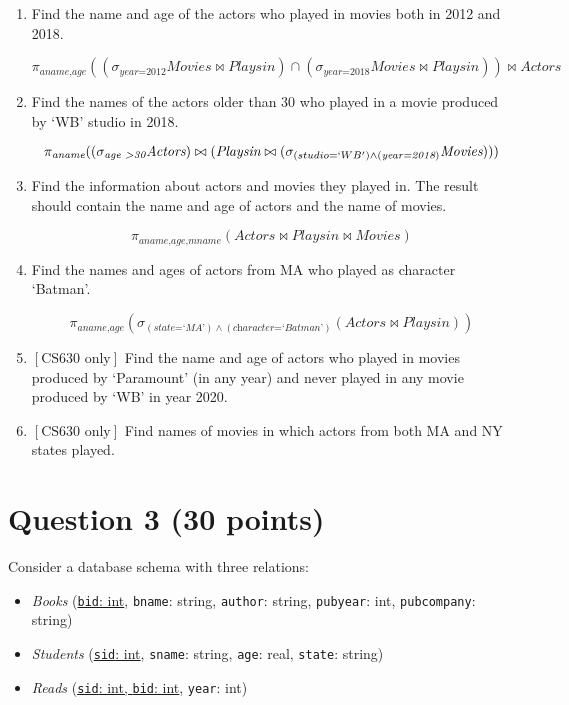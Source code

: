 \documentclass[letterpaper, 11pt]{article}
\begin{document}
\begin{enumerate}[label={\alph*}),leftmargin=*]
\begin{tcolorbox}
    \end{tcolorbox}    
    \item Find the name and age of the actors who played in movies both in 2012 and 2018.
    \begin{tcolorbox}
    \[\pi_{\textit{aname,age}}((\sigma_{\textit{year=2012}}\textit{Movies} \bowtie \textit{Playsin}) \cap (\sigma_{\textit{year=2018}}\textit{Movies} \bowtie \textit{Playsin})) \bowtie \textit{Actors}\]
    \end{tcolorbox}    
    \item Find the names of the actors older than 30 who played in a movie produced by `WB' studio in 2018.
    \begin{tcolorbox}
    \[\pi_{\textit{aname}}((\sigma_{\textit{age \textgreater 30}}\textit{Actors}) \bowtie (\textit{Playsin} \bowtie (\sigma_{(studio=`WB') \wedge (\textit{year=2018})}\textit{Movies})))\]
    \end{tcolorbox}    
    \item Find the information about actors and movies they played in. The result should contain the name and age of actors and the name of movies.
    \begin{tcolorbox}
    \[\pi_{\textit{aname,age,mname}}(\textit{Actors} \bowtie \textit{Playsin} \bowtie \textit{Movies})\]
    \end{tcolorbox}    
    \item Find the names and ages of actors from MA who played as character `Batman'.
    \begin{tcolorbox}
    \[\pi_{\textit{aname,age}}(\sigma_{(\textit{state=`MA'})\wedge (\textit{character=`Batman'})}(\textit{Actors} \bowtie \textit{Playsin}))\]
    \end{tcolorbox}    
    \item $\left[\text{CS630 only}\right]$ Find the name and age of actors who played in movies produced by `Paramount' (in any year) and never played in any movie produced by `WB' in year 2020.
    \item $\left[\text{CS630 only}\right]$ Find names of movies in which actors from both MA and NY states played.
\end{enumerate}

\section*{Question 3 (30 points)}

Consider a database schema with three relations:
\begin{itemize}
    \item \textit{Books} (\ul{\texttt{bid}: int}, \texttt{bname}: string, \texttt{author}: string, \texttt{pubyear}: int, \texttt{pubcompany}: string)
    \item \textit{Students} (\ul{\texttt{sid}: int}, \texttt{sname}: string, \texttt{age}: real, \texttt{state}: string)
    \item \textit{Reads} (\ul{\texttt{sid}: int, \texttt{bid}: int}, \texttt{year}: int)
\end{itemize}
\end{document}
